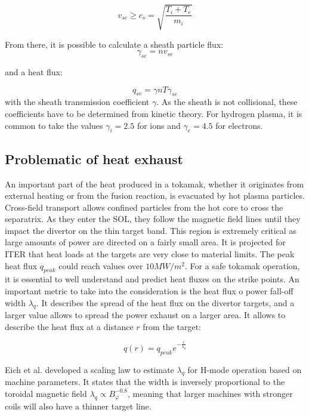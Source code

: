 \begin{equation}
	\label{eq:intro_BohmCriterion}
	v_{se} \ge c_s = \sqrt{\frac{T_i+T_e}{m_i}}
\end{equation}

From there, it is possible to calculate a sheath particle flux:
\begin{equation}
	\gamma_{se} = nv_{se}
\end{equation}

and a heat flux:

\begin{equation}
	q_{se} = \gamma n T \gamma_{se}
\end{equation}
with the sheath transmission coefficient $\gamma$. As the sheath is not collisional, these coefficients have to be determined from kinetic theory\cite{Stangeby_2000}. For hydrogen plasma, it is common to take the values $\gamma_i = 2.5$ for ions and $\gamma_e = 4.5$ for electrons.


\subsection{Problematic of heat exhaust}
\label{ssec:intro_heatExhaust}
An important part of the heat produced in a tokamak, whether it originates from external heating or from the fusion reaction, is evacuated by hot plasma particles. Cross-field transport allows confined particles from the hot core to cross the separatrix. As they enter the SOL, they follow the magnetic field lines until they impact the divertor on the thin target band. This region is extremely critical as large amounts of power are directed on a fairly small area. It is projected for ITER that heat loads at the targets are very close to material limits\cite{gunn2017surface}. The peak heat flux $q_{peak}$ could reach values over $10MW/m^2$. For a safe tokamak operation, it is essential to well understand and predict heat fluxes on the strike points. An important metric to take into the consideration is the heat flux o power fall-off width $\lambda_q$. It describes the spread of the heat flux on the divertor targets, and a larger value allows to spread the power exhaust on a larger area. It allows to describe the heat flux at a distance $r$ from the target:

\begin{equation}
	q(r) =  q_{peak}e^{-\frac{r}{\lambda_q}}
\end{equation}

Eich et al.\cite{eich2013scaling} developed a scaling law to estimate $\lambda_q$ for H-mode operation based on machine parameters. It states that the width is inversely proportional to the toroidal magnetic field $\lambda_q\propto B_\varphi^{-0.8}$, meaning that larger machines with stronger coils will also have a thinner target line. 










